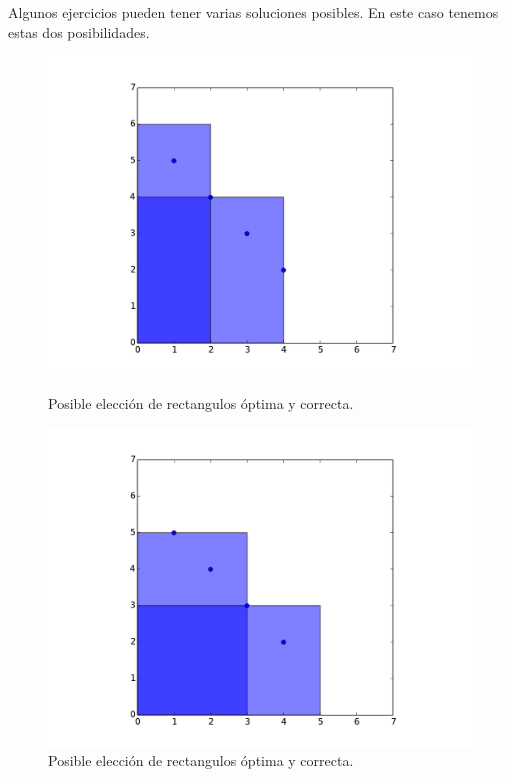 Algunos ejercicios pueden tener varias soluciones posibles. En este caso tenemos estas dos posibilidades.

\begin{figure}[H]
\centering
\begin{minipage}{0.49\textwidth}
  \centering
    \includegraphics[width=1\textwidth]{img/ejemplos/ej2-3.pdf}
  \caption{\footnotesize Posible elección de rectangulos óptima y correcta.}
  \label{fig:ej3-1}
\end{minipage}%
\hspace{0.01\textwidth}
\begin{minipage}{0.49\textwidth}   
  \centering
    \includegraphics[width=1\textwidth]{img/ejemplos/ej2-4.pdf} 
  \caption{\footnotesize Posible elección de rectangulos óptima y correcta.}
  \label{fig:ej3-2}
\end{minipage}%
\end{figure}



